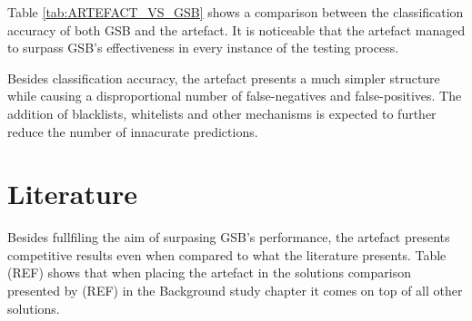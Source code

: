 Table \ref{tab:ARTEFACT_VS_GSB} shows a comparison between the classification accuracy of both GSB and the artefact. It is noticeable that the artefact managed to surpass GSB's effectiveness in every instance of the testing process.

Besides classification accuracy, the artefact presents a much simpler structure while causing a disproportional number of false-negatives and false-positives. The addition of blacklists, whitelists and other mechanisms is expected to further reduce the number of innacurate predictions.



\section{Literature}
Besides fullfiling the aim of surpasing GSB's performance, the artefact presents competitive results even when compared to what the literature presents. Table (REF) shows that when placing the artefact in the solutions comparison presented by (REF) in the Background study chapter it comes on top of all other solutions. 


